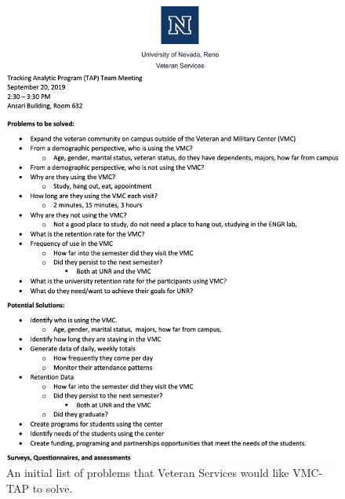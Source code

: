 \begin{figure}[H]
	\begin{centering}
	\includegraphics[width=0.90\linewidth, height=1.25\linewidth]{sections/project_related_resources/Problems_To_Be_Solved_By_TAP.png}
	\caption{An initial list of problems that Veteran Services would like VMC-TAP to solve.}
	\label{fig:vs_problems_to_solve}
	\end{centering}
\end{figure}

